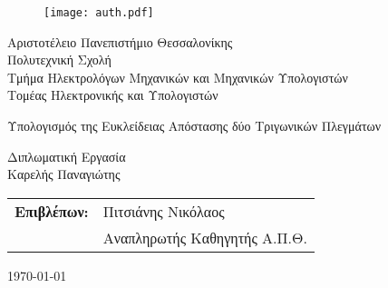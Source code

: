 \begin{titlepage}

\begin{figure}[H]
  \begin{center}
    \texttt{[image: auth.pdf]}
    \label{fig:cover_auth_logo}
  \end{center}
\end{figure}

\centering
\Large Αριστοτέλειο Πανεπιστήμιο Θεσσαλονίκης\\
\Large Πολυτεχνική Σχολή\\
\large Τμήμα Ηλεκτρολόγων Μηχανικών και Μηχανικών Υπολογιστών\\
\large Τομέας Ηλεκτρονικής και Υπολογιστών

\vspace{\fill}

\LARGE Υπολογισμός της Ευκλείδειας Απόστασης δύο Τριγωνικών Πλεγμάτων

\vspace{\fill}

\Large Διπλωματική Εργασία\\
\Large Καρελής Παναγιώτης

\vspace{\fill}
\raggedright

\begin{tabular}{ll}
\textbf{Επιβλέπων:} & Πιτσιάνης Νικόλαος\\
 & Αναπληρωτής Καθηγητής Α.Π.Θ.\\
\end{tabular}

\centering
\vspace{\fill}
\today

\end{titlepage}

